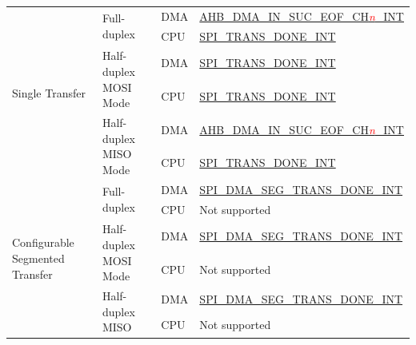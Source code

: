 \documentclass[main\_\_EN.tex]{subfiles}
\begin{document}
\begin{ThreePartTable}
\begin{longtable}[c]{|l|l|l|l|}
\multirow{6}{*}{Single Transfer} & \multirow{2}{*}{Full-duplex} & DMA & \hyperref[int:GDMAINSUCEOFINT]{AHB\_DMA\_IN\_SUC\_EOF\_CH\textcolor{red}{\it{n}}\_INT} \tnote{1} \\ \cline{3-4}
&& CPU & \hyperref[int:SPITRANSDONEINT]{SPI\_TRANS\_DONE\_INT} \tnote{2}  \\ \cline{2-4}
& \multirow{2}{*}{Half-duplex MOSI Mode} & DMA & \hyperref[int:SPITRANSDONEINT]{SPI\_TRANS\_DONE\_INT} \\ \cline{3-4}
&& CPU & \hyperref[int:SPITRANSDONEINT]{SPI\_TRANS\_DONE\_INT}  \\ \cline{2-4}
& \multirow{2}{*}{Half-duplex MISO Mode} & DMA & \hyperref[int:GDMAINSUCEOFINT]{AHB\_DMA\_IN\_SUC\_EOF\_CH\textcolor{red}{\it{n}}\_INT} \\ \cline{3-4}
&& CPU & \hyperref[int:SPITRANSDONEINT]{SPI\_TRANS\_DONE\_INT} \\ \hline
\multirow{6}{*}{Configurable Segmented Transfer} & \multirow{2}{*}{Full-duplex} & DMA & \hyperref[int:SPIDMASEGTRANSDONEINT]{SPI\_DMA\_SEG\_TRANS\_DONE\_INT} \tnote{3} \\ \cline{3-4}
&& CPU & Not supported       \\ \cline{2-4}
& \multirow{2}{*}{Half-duplex MOSI Mode} & DMA  & \hyperref[int:SPIDMASEGTRANSDONEINT]{SPI\_DMA\_SEG\_TRANS\_DONE\_INT} \\ \cline{3-4}
&& CPU           & Not supported       \\ \cline{2-4}
& \multirow{2}{*}{Half-duplex MISO} & DMA & \hyperref[int:SPIDMASEGTRANSDONEINT]{SPI\_DMA\_SEG\_TRANS\_DONE\_INT} \\ \cline{3-4}
&& CPU & Not supported       \\ \hline
\end{longtable}
\end{ThreePartTable}

\clearpage
\end{document}
